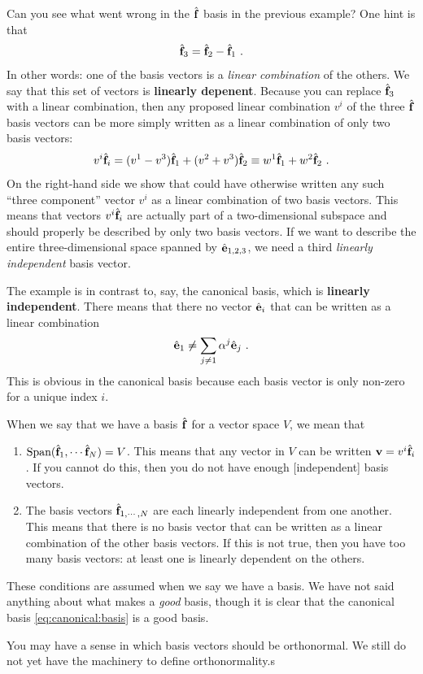 \documentclass[12pt, oneside]{report}    %
\begin{document}
Can you see what went wrong in the $\hat{\mathbf{f}}$ basis in the previous example? One hint is that
\begin{align}
    \hat{\mathbf{f}}_3 = \hat{\mathbf{f}}_2 - \hat{\mathbf{f}}_1 \ .
\end{align}
In other words: one of the basis vectors is a \emph{linear combination} of the others. We say that this set of vectors is \textbf{linearly depenent}.  Because you can replace $\hat{\mathbf{f}}_3$ with a linear combination, then any proposed linear combination $v^i$ of the three $\hat{\mathbf{f}}$ basis vectors can be more simply written as a linear combination of only two basis vectors:
\begin{align}
    v^i \hat{\mathbf{f}}_i = (v^1-v^3)\hat{\mathbf{f}}_1 + (v^2+v^3)\hat{\mathbf{f}}_2 \equiv w^1 \hat{\mathbf{f}}_1 + w^2\hat{\mathbf{f}}_2 \ .
\end{align}
On the right-hand side we show that could have otherwise written any such ``three component'' vector $v^i$ as a linear combination of two basis vectors. This means that vectors $v^i\hat{\mathbf{f}}_i$ are actually part of a two-dimensional subspace and should properly be described by only two basis vectors. If we want to describe the entire three-dimensional space spanned by $\hat{\mathbf{e}}_{1,2,3}$, we need a third \emph{linearly independent} basis vector. 

The example is in contrast to, say, the canonical basis, which is \textbf{linearly independent}. There means that there no vector $\hat{\mathbf{e}}_i$ that can be written as a linear combination
\begin{align}
    \hat{\mathbf{e}}_1 \neq \sum_{j \neq 1} \alpha^j \hat{\mathbf{e}}_j \ .
\end{align}
This is obvious in the canonical basis because each basis vector is only non-zero for a unique index $i$.


\begin{bigidea}[Basis]
When we say that we have a basis $\hat{\mathbf{f}}$ for a vector space $V$, we mean that
\begin{enumerate}
    \item $\textnormal{Span}(\hat{\mathbf{f}}_1, \cdots \hat{\mathbf{f}}_N) = V$. This means that any vector in $V$ can be written $\mathbf{v} = v^i \hat{\mathbf{f}}_i$. If you cannot do this, then you do not have enough [independent] basis vectors.
    \item The basis vectors $\hat{\mathbf{f}}_{1,\cdots,N}$ are each linearly independent from one another. This means that there is no basis vector that can be written as a linear combination of the other basis vectors. If this is not true, then you have too many basis vectors: at least one is linearly dependent on the others.
\end{enumerate}
These conditions are assumed when we say we have a basis. We have not said anything about what makes a \emph{good} basis, though it is clear that the canonical basis \eqref{eq:canonical:basis} is a good basis.
\end{bigidea}
You may have a sense in which basis vectors should be orthonormal. We still do not yet have the machinery to define orthonormality.s
\end{document}
